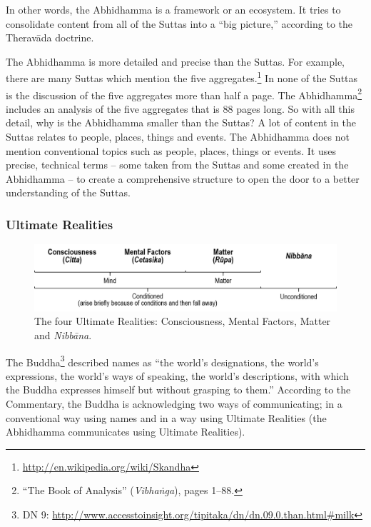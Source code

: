In other words, the Abhidhamma is a framework or an ecosystem. It tries to consolidate content from all of the Suttas into a “big picture,” according to the Theravāda doctrine.

The Abhidhamma is more detailed and precise than the Suttas. For example, there are many Suttas which mention the five aggregates.\footnote{\url{http://en.wikipedia.org/wiki/Skandha}} In none of the Suttas is the discussion of the five aggregates more than half a page. The Abhidhamma\footnote{“The Book of Analysis” (\textit{Vibhaṅga}), pages 1--88.} includes an analysis of the five aggregates that is 88 pages long. So with all this detail, why is the Abhidhamma smaller than the Suttas? A lot of content in the Suttas relates to people, places, things and events. The Abhidhamma does not mention conventional topics such as people, places, things or events. It uses precise, technical terms – some taken from the Suttas and some created in the Abhidhamma – to create a comprehensive structure to open the door to a better understanding of the Suttas.

\subsubsection*{Ultimate Realities}

\begin{figure}[H]
\centering
\includegraphics[width=0.9\linewidth]{./Diagrams/Realities}
\caption{The four Ultimate Realities: Consciousness, Mental Factors, Matter and \textit{Nibbāna}.}
\label{fig:Realities}
\end{figure}

The Buddha\footnote{DN 9: \url{http://www.accesstoinsight.org/tipitaka/dn/dn.09.0.than.html\#milk}} described names as “the world’s designations, the world’s expressions, the world’s ways of speaking, the world’s descriptions, with which the Buddha expresses himself but without grasping to them.” According to the Commentary, the Buddha is acknowledging two ways of communicating; in a conventional way using names and in a way using Ultimate Realities (the Abhidhamma communicates using Ultimate Realities).

